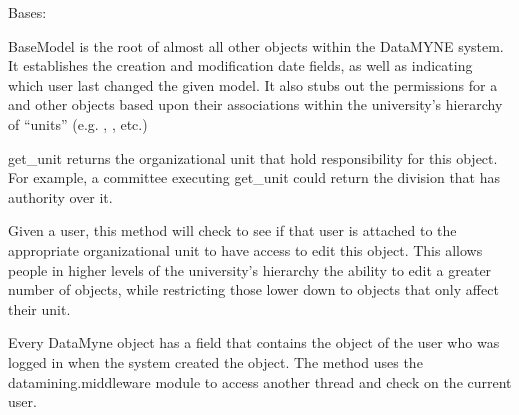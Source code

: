 \documentclass[letterpaper,10pt,english]{sphinxmanual}
\begin{document}

\begin{fulllineitems}
\label{generated/apps.profiles.models:apps.profiles.models.BaseModel}
Bases: 

BaseModel is the root of almost all other objects within the DataMYNE
system. It establishes the creation and modification date fields, as well 
as indicating which user last changed the given model.  It also stubs out
the permissions for a  and other objects based upon their 
associations within the university's hierarchy of ``units'' 
(e.g. , , etc.)


\begin{fulllineitems}
\label{generated/apps.profiles.models:apps.profiles.models.BaseModel.get_unit}
get\_unit returns the organizational unit that hold responsibility
for this object.  For example, a committee executing get\_unit could
return the division that has authority over it.

\end{fulllineitems}



\begin{fulllineitems}
\label{generated/apps.profiles.models:apps.profiles.models.BaseModel.has_unit_permission}
Given a user, this method will check to see if that user is
attached to the appropriate organizational unit to have access
to edit this object.  This allows people in higher levels of
the university's hierarchy the ability to edit a greater number
of objects, while restricting those lower down to objects that
only affect their unit.

\end{fulllineitems}



\begin{fulllineitems}
\label{generated/apps.profiles.models:apps.profiles.models.BaseModel.save}
Every DataMyne object has a  field that contains the 
object of the user who was logged in when the system created the
object.  The method uses the datamining.middleware module to access
another thread and check on the current user.


\end{fulllineitems}
\end{fulllineitems}
\end{document}
